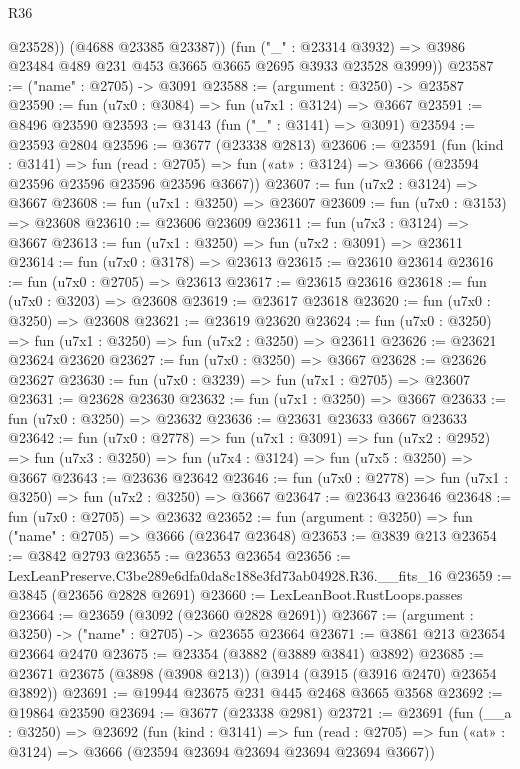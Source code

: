 \begin{lexlean}{R36}
\begin{coremodule}
            @23528))
        (@4688 @23385 @23387))
      (fun ("_" : @23314 @3932) =>
      @3986 @23484 @489 @231 @453 @3665 @3665 @2695 @3933 @23528 @3999))
@23587 := ("name" : @2705) -> @3091
@23588 := (argument : @3250) -> @23587
@23590 := fun (u7x0 : @3084) => fun (u7x1 : @3124) => @3667
@23591 := @8496 @23590
@23593 := @3143 (fun ("_" : @3141) => @3091)
@23594 := @23593 @2804
@23596 := @3677 (@23338 @2813)
@23606 := @23591
    (fun (kind : @3141) =>
    fun (read : @2705) => fun («at» : @3124) => @3666 (@23594 @23596 @23596 @23596 @23596 @3667))
@23607 := fun (u7x2 : @3124) => @3667
@23608 := fun (u7x1 : @3250) => @23607
@23609 := fun (u7x0 : @3153) => @23608
@23610 := @23606 @23609
@23611 := fun (u7x3 : @3124) => @3667
@23613 := fun (u7x1 : @3250) => fun (u7x2 : @3091) => @23611
@23614 := fun (u7x0 : @3178) => @23613
@23615 := @23610 @23614
@23616 := fun (u7x0 : @2705) => @23613
@23617 := @23615 @23616
@23618 := fun (u7x0 : @3203) => @23608
@23619 := @23617 @23618
@23620 := fun (u7x0 : @3250) => @23608
@23621 := @23619 @23620
@23624 := fun (u7x0 : @3250) => fun (u7x1 : @3250) => fun (u7x2 : @3250) => @23611
@23626 := @23621 @23624 @23620
@23627 := fun (u7x0 : @3250) => @3667
@23628 := @23626 @23627
@23630 := fun (u7x0 : @3239) => fun (u7x1 : @2705) => @23607
@23631 := @23628 @23630
@23632 := fun (u7x1 : @3250) => @3667
@23633 := fun (u7x0 : @3250) => @23632
@23636 := @23631 @23633 @3667 @23633
@23642 := fun (u7x0 : @2778) =>
  fun (u7x1 : @3091) =>
  fun (u7x2 : @2952) => fun (u7x3 : @3250) => fun (u7x4 : @3124) => fun (u7x5 : @3250) => @3667
@23643 := @23636 @23642
@23646 := fun (u7x0 : @2778) => fun (u7x1 : @3250) => fun (u7x2 : @3250) => @3667
@23647 := @23643 @23646
@23648 := fun (u7x0 : @2705) => @23632
@23652 := fun (argument : @3250) => fun ("name" : @2705) => @3666 (@23647 @23648)
@23653 := @3839 @213
@23654 := @3842 @2793
@23655 := @23653 @23654
@23656 := LexLeanPreserve.C3be289e6dfa0da8c188e3fd73ab04928.R36.__fits_16
@23659 := @3845 (@23656 @2828 @2691)
@23660 := LexLeanBoot.RustLoops.passes
@23664 := @23659 (@3092 (@23660 @2828 @2691))
@23667 := (argument : @3250) -> ("name" : @2705) -> @23655 @23664
@23671 := @3861 @213 @23654 @23664 @2470
@23675 := @23354 (@3882 (@3889 @3841) @3892)
@23685 := @23671 @23675 (@3898 (@3908 @213)) (@3914 (@3915 (@3916 @2470) @23654 @3892))
@23691 := @19944 @23675 @231 @445 @2468 @3665 @3568
@23692 := @19864 @23590
@23694 := @3677 (@23338 @2981)
@23721 := @23691
    (fun (__a : @3250) =>
    @23692
      (fun (kind : @3141) =>
      fun (read : @2705) => fun («at» : @3124) => @3666 (@23594 @23694 @23694 @23694 @23694 @3667))

\end{coremodule}
\end{lexlean}
